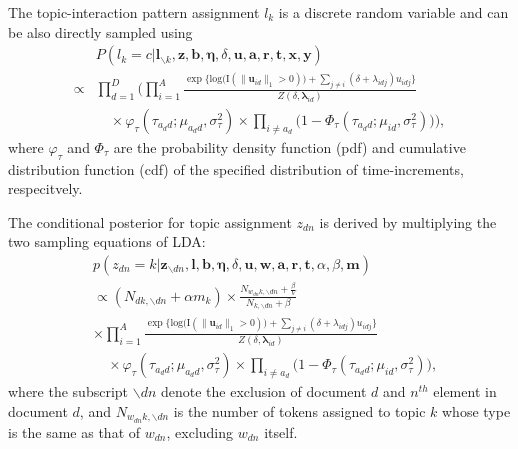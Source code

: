 \documentclass{article}
\begin{document}
The topic-interaction pattern assignment $l_k$ is a discrete random variable and can be also directly sampled using
       \begin{equation}
       \begin{aligned} & 
       P(l_k=c|\boldsymbol{l}_{\backslash k}, \boldsymbol{z}, \boldsymbol{b},\boldsymbol{\eta}, \delta, \boldsymbol{u}, \boldsymbol{a}, \boldsymbol{r}, \boldsymbol{t}, \boldsymbol{x},  \boldsymbol{y})\\
     \propto   &\prod_{d=1}^D\Big(
       \prod_{i=1}^A \frac{\exp\Big\{\mbox{log}\big(\text{I}( \lVert \boldsymbol{u}_{id}\rVert_1 > 0)\big) + \sum\limits_{j \neq i} (\delta+\lambda_{idj})u_{idj}\Big\}}{Z(\delta,\boldsymbol{\lambda}_{id})}
       \\&\quad\times\varphi_{\tau}(\tau_{a_d d}; \mu_{a_d d}, \sigma_\tau^2)\times \prod_{i\neq a_d}\big(1-\Phi_{\tau}(\tau_{a_d d}; \mu_{i d}, \sigma_\tau^2) \big)\Big),
       \end{aligned}
       \end{equation}
where $\varphi_\tau$ and $\Phi_\tau$ are the probability density function (pdf) and cumulative distribution function (cdf) of the specified distribution of time-increments, respecitvely. 

The conditional posterior for topic assignment $z_{dn}$ is derived by multiplying the two sampling equations of LDA:
  	   \begin{equation}
  	   \begin{aligned}
  	   &p(z_{dn}=k| \boldsymbol{z}_{\backslash dn}, \boldsymbol{l}, \boldsymbol{b},\boldsymbol{\eta}, \delta, \boldsymbol{u}, \boldsymbol{w}, \boldsymbol{a}, \boldsymbol{r}, \boldsymbol{t}, \alpha, \beta, \boldsymbol{m})\\&\propto
  	   ({N_{dk, \backslash dn}+\alpha m_k})\times 	  \frac{N_{w_{dn}k, \backslash dn}+\frac{\beta}{V}}{N_{k, \backslash dn}+\beta}
  	   \\&  \times \prod_{i=1}^A \frac{\exp\Big\{\mbox{log}\big(\text{I}( \lVert \boldsymbol{u}_{id}\rVert_1 > 0)\big) + \sum\limits_{j \neq i} (\delta+\lambda_{idj})u_{idj}\Big\}}{Z(\delta,\boldsymbol{\lambda}_{id})}
  	   \\&\quad\times\varphi_{\tau}(\tau_{a_d d}; \mu_{a_d d}, \sigma_\tau^2)\times \prod_{i\neq a_d}\big(1-\Phi_{\tau}(\tau_{a_d d}; \mu_{i d}, \sigma_\tau^2) \big),
  	   \end{aligned}
  	   \end{equation}
  	   where the subscript $\backslash dn$ denote the exclusion of document $d$ and $n^{th}$ element in document $d$, and $N_{w_{dn}k, \backslash dn}$ is the number of tokens assigned to topic $k$ whose type is the same as that of $w_{dn}$, excluding $w_{dn}$ itself. 
  	   
\end{document}
